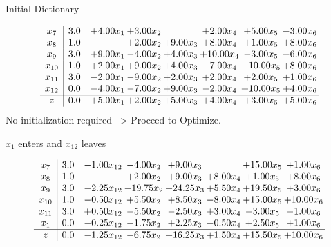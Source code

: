 \documentclass[8pt]{article}
\begin{document}
Initial Dictionary 

\[\begin{array}{c| c c@{\hskip 2pt} c@{\hskip 2pt} c@{\hskip 2pt} c@{\hskip 2pt} c@{\hskip 2pt} c@{\hskip 2pt} }
 x_{7}   &  3.0 & +  4.00 x_{1} & +  3.00 x_{2} &   & +  2.00 x_{4} & +  5.00 x_{5} & -3.00 x_{6}\\
 x_{8}   &  1.0  &   & +  2.00 x_{2} & +  9.00 x_{3} & +  8.00 x_{4} & +  1.00 x_{5} & +  8.00 x_{6}\\
 x_{9}   &  3.0 & +  9.00 x_{1} & -4.00 x_{2} & +  4.00 x_{3} & + 10.00 x_{4} & -3.00 x_{5} & -6.00 x_{6}\\
 x_{10}   &  1.0 & +  2.00 x_{1} & +  9.00 x_{2} & +  4.00 x_{3} & -7.00 x_{4} & + 10.00 x_{5} & +  8.00 x_{6}\\
 x_{11}   &  3.0 & -2.00 x_{1} & -9.00 x_{2} & +  2.00 x_{3} & +  2.00 x_{4} & +  2.00 x_{5} & +  1.00 x_{6}\\
 x_{12}   &  0.0 & -4.00 x_{1} & -7.00 x_{2} & +  9.00 x_{3} & -2.00 x_{4} & + 10.00 x_{5} & +  4.00 x_{6}\\
\hline
z    &  0.0 & +  5.00 x_{1} & +  2.00 x_{2} & +  5.00 x_{3} & +  4.00 x_{4} & +  3.00 x_{5} & +  5.00 x_{6}\\
\end{array}\]
No initialization required --> Proceed to Optimize. 


 $ x_{1} $ enters and $ x_{12} $ leaves 

 \[\begin{array}{c| c c@{\hskip 2pt} c@{\hskip 2pt} c@{\hskip 2pt} c@{\hskip 2pt} c@{\hskip 2pt} c@{\hskip 2pt} }
 x_{7}   &  3.0 & -1.00 x_{12} & -4.00 x_{2} & +  9.00 x_{3} &   & + 15.00 x_{5} & +  1.00 x_{6}\\
 x_{8}   &  1.0  &   & +  2.00 x_{2} & +  9.00 x_{3} & +  8.00 x_{4} & +  1.00 x_{5} & +  8.00 x_{6}\\
 x_{9}   &  3.0 & -2.25 x_{12} & -19.75 x_{2} & + 24.25 x_{3} & +  5.50 x_{4} & + 19.50 x_{5} & +  3.00 x_{6}\\
 x_{10}   &  1.0 & -0.50 x_{12} & +  5.50 x_{2} & +  8.50 x_{3} & -8.00 x_{4} & + 15.00 x_{5} & + 10.00 x_{6}\\
 x_{11}   &  3.0 & +  0.50 x_{12} & -5.50 x_{2} & -2.50 x_{3} & +  3.00 x_{4} & -3.00 x_{5} & -1.00 x_{6}\\
 x_{1}   &  0.0 & -0.25 x_{12} & -1.75 x_{2} & +  2.25 x_{3} & -0.50 x_{4} & +  2.50 x_{5} & +  1.00 x_{6}\\
\hline
z    &  0.0 & -1.25 x_{12} & -6.75 x_{2} & + 16.25 x_{3} & +  1.50 x_{4} & + 15.50 x_{5} & + 10.00 x_{6}\\
\end{array}\]
\end{document}
